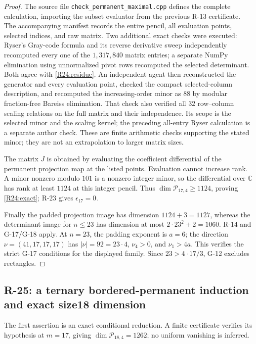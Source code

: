 \begin{proof}
The source file \texttt{check\_permanent\_maximal.cpp} defines the
complete calculation, importing the subset evaluator from the
previous R-13 certificate. The accompanying manifest records the
entire pencil, all evaluation points, selected indices, and raw
matrix. Two additional exact checks were executed: Ryser's
Gray-code formula and its reverse derivative sweep independently
recomputed every one of the $1{,}317{,}840$ matrix entries; a
separate NumPy elimination using unnormalized pivot rows recomputed
the selected determinant. Both agree with \eqref{R24:residue}.
An independent agent then reconstructed the generator and every
evaluation point, checked the compact selected-column description,
and recomputed the increasing-order minor as $88$ by modular
fraction-free Bareiss elimination. That check also verified all
$32$ row--column scaling relations on the full matrix and their
independence. Its scope is the selected minor and the scaling
kernel; the preceding all-entry Ryser calculation is a separate
author check.
These are finite arithmetic checks supporting the stated minor;
they are not an extrapolation to larger matrix sizes.

The matrix $J$ is obtained by evaluating the coefficient
differential of the permanent projection map at the listed points.
Evaluation cannot increase rank. A minor nonzero modulo $101$
is a nonzero integer minor, so the differential over $\mathbb C$
has rank at least $1124$ at this integer pencil. Thus
$\dim\mathcal P_{17,4}\geq1124$, proving
\eqref{R24:exact}; R-23 gives $\epsilon_{17}=0$.

Finally the padded projection image has dimension $1124+3=1127$,
whereas the determinant image for $n\leq23$ has dimension at most
$2\cdot23^2+2=1060$. R-14 and G-17/G-18 apply. At $n=23$,
the padding exponent is $a=6$; the direction
$\nu=(41,17,17,17)$ has $|\nu|=92=23\cdot4$,
$\nu_4>0$, and $\nu_1>4a$. This verifies the strict G-17
conditions for the displayed family. Since $23>4\cdot17/3$,
G-12 excludes rectangles.
\end{proof}


\subsection{R-25: a ternary bordered-permanent induction and exact size18 dimension}

The first assertion is an exact conditional reduction. A finite
certificate verifies its hypothesis at $m=17$, giving
$\dim\mathcal P_{18,4}=1262$; no uniform vanishing is inferred.

